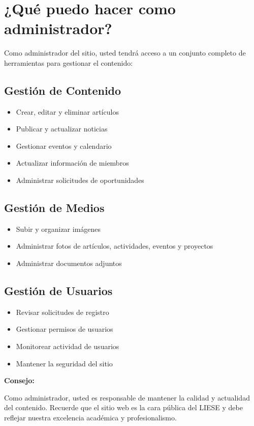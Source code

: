 \documentclass[12pt,letterpaper]{report}
\newenvironment{tip}
    {\begin{mdframed}[linecolor=tip-green,linewidth=2pt,backgroundcolor=tip-green!10]
    \textbf{Consejo:}\par}
    {\end{mdframed}}
\begin{document}
\section{¿Qué puedo hacer como administrador?}
Como administrador del sitio, usted tendrá acceso a un conjunto completo de herramientas para gestionar el contenido:

\subsection{Gestión de Contenido}
\begin{itemize}
    \item Crear, editar y eliminar artículos
    \item Publicar y actualizar noticias
    \item Gestionar eventos y calendario
    \item Actualizar información de miembros
    \item Administrar solicitudes de oportunidades
\end{itemize}

\subsection{Gestión de Medios}
\begin{itemize}
    \item Subir y organizar imágenes
    \item Administrar fotos de artículos, actividades, eventos y proyectos
    \item Administrar documentos adjuntos
\end{itemize}

\subsection{Gestión de Usuarios}
\begin{itemize}
    \item Revisar solicitudes de registro
    \item Gestionar permisos de usuarios
    \item Monitorear actividad de usuarios
    \item Mantener la seguridad del sitio
\end{itemize}

\begin{tip}
Como administrador, usted es responsable de mantener la calidad y actualidad del contenido. Recuerde que el sitio web es la cara pública del LIESE y debe reflejar nuestra excelencia académica y profesionalismo.
\end{tip}
\end{document}
